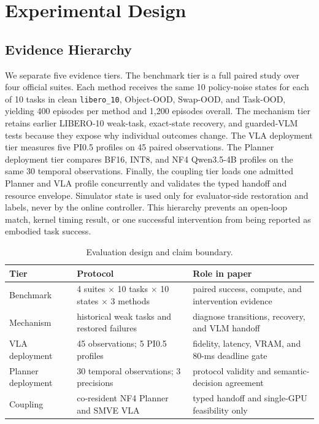 \documentclass[runningheads]{waica}
\begin{document}
\section{Experimental Design}
\label{sec:experiments}

\subsection{Evidence Hierarchy}

We separate five evidence tiers. The benchmark tier is a full paired study over
four official suites. Each method receives the same 10 policy-noise states for
each of 10 tasks in clean \texttt{libero\_10}, Object-OOD, Swap-OOD, and
Task-OOD, yielding 400 episodes per method and 1,200 episodes overall. The
mechanism tier retains earlier LIBERO-10 weak-task, exact-state recovery, and
guarded-VLM tests because they expose why individual outcomes change. The VLA
deployment tier measures five PI0.5 profiles on 45 paired observations. The
Planner deployment tier compares BF16, INT8, and NF4 Qwen3.5-4B profiles on the
same 30 temporal observations. Finally, the coupling tier loads one admitted
Planner and VLA profile concurrently and validates the typed handoff and
resource envelope. Simulator state is used only for evaluator-side restoration
and labels, never by the online controller. This hierarchy prevents an
open-loop match, kernel timing result, or one successful intervention from
being reported as embodied task success.

\begin{table}
\caption{Evaluation design and claim boundary.}
\label{tab:evidence}
\centering
\small
\begin{tabularx}{\textwidth}{p{}p{}X}
\toprule
Tier & Protocol & Role in paper \\
\midrule
Benchmark & 4 suites $\times$ 10 tasks $\times$ 10 states $\times$ 3 methods & paired success, compute, and intervention evidence \\
Mechanism & historical weak tasks and restored failures & diagnose transitions, recovery, and VLM handoff \\
VLA deployment & 45 observations; 5 PI0.5 profiles & fidelity, latency, VRAM, and 80-ms deadline gate \\
Planner deployment & 30 temporal observations; 3 precisions & protocol validity and semantic-decision agreement \\
Coupling & co-resident NF4 Planner and SMVE VLA & typed handoff and single-GPU feasibility only \\
\bottomrule
\end{tabularx}
\end{table}
\end{document}
